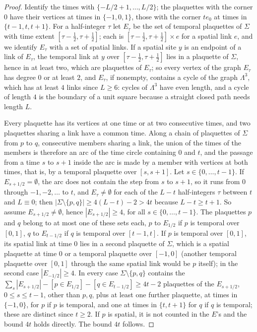 \begin{proof}
Identify the times with $\{-L/2+1,\dots,L/2\}$; the plaquettes with the
corner $0$ have their vertices at times in $\{-1,0,1\}$, those with the
corner $te_0$ at times in $\{t-1,t,t+1\}$. For a half-integer $\tau$ let
$E_\tau$ be the set of temporal plaquettes of $\Sigma$ with time extent
$[\tau-\tfrac12,\tau+\tfrac12]$; each is $[\tau-\tfrac12,\tau+\tfrac12]
\times e$ for a spatial link $e$, and we identify $E_\tau$ with a set of
spatial links. If a spatial site $y$ is an endpoint of a link of
$E_\tau$, the temporal link at $y$ over $[\tau-\tfrac12,\tau+\tfrac12]$
lies in a plaquette of $\Sigma$, hence in at least two, which are
plaquettes of $E_\tau$; so every vertex of the graph $E_\tau$ has degree
$0$ or at least $2$, and $E_\tau$, if nonempty, contains a cycle of the
graph $\Lambda^3$, which has at least $4$ links since $L\ge6$: cycles of
$\Lambda^3$ have even length, and a cycle of length $4$ is the boundary
of a unit square because a straight closed path needs length $L$.

Every plaquette has its vertices at one time or at two consecutive times,
and two plaquettes sharing a link have a common time. Along a chain of
plaquettes of $\Sigma$ from $p$ to $q$, consecutive members sharing a
link, the union of the times of the members is therefore an arc of the
time circle containing $0$ and $t$, and the passage from a time $s$ to
$s+1$ inside the arc is made by a member with vertices at both times, that
is, by a temporal plaquette over $[s,s+1]$. Let $s\in\{0,\dots,t-1\}$. If
$E_{s+1/2}=\emptyset$, the arc does not contain the step from $s$ to
$s+1$, so it runs from $0$ through $-1,-2,\dots$ to $t$, and $E_\tau\ne
\emptyset$ for each of the $L-t$ half-integers $\tau$ between $t$ and
$L\equiv0$; then $|\Sigma\setminus\{p,q\}|\ge4(L-t)-2>4t$ because $L-t\ge
t+1$. So assume $E_{s+1/2}\ne\emptyset$, hence $|E_{s+1/2}|\ge4$, for all
$s\in\{0,\dots,t-1\}$. The plaquettes $p$ and $q$ belong to at most one
of these sets each, $p$ to $E_{1/2}$ if $p$ is temporal over $[0,1]$, $q$
to $E_{t-1/2}$ if $q$ is temporal over $[t-1,t]$. If $p$ is temporal over
$[0,1]$, its spatial link at time $0$ lies in a second plaquette of
$\Sigma$, which is a spatial plaquette at time $0$ or a temporal plaquette
over $[-1,0]$ (another temporal plaquette over $[0,1]$ through the same
spatial link would be $p$ itself); in the second case $|E_{-1/2}|\ge4$. In
every case $\Sigma\setminus\{p,q\}$ contains the $\sum_s|E_{s+1/2}|-[p\in
E_{1/2}]-[q\in E_{t-1/2}]\ge4t-2$ plaquettes of the $E_{s+1/2}$, $0\le s
\le t-1$, other than $p,q$, plus at least one further plaquette, at times
in $\{-1,0\}$, for $p$ if $p$ is temporal, and one at times in $\{t,t+1\}$
for $q$ if $q$ is temporal; these are distinct since $t\ge2$. If $p$ is
spatial, it is not counted in the $E$'s and the bound $4t$ holds
directly. The bound $4t$ follows.


\end{proof}
